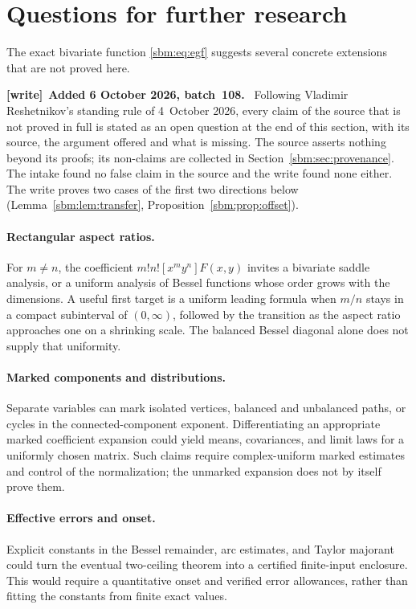 \documentclass[11pt,letterpaper]{article}
\numberwithin{equation}{section}
\theoremstyle{remark}\newtheorem{remark}[theorem]{Remark}
\newenvironment{writenote}[1][]{\par\smallskip\begingroup\small
 \noindent\textbf{[write]}\if\relax\detokenize{#1}\relax\else~\textbf{#1.}\fi\ }%
 {\par\endgroup\smallskip}
\begin{document}
\section{Questions for further research}\label{sbm:sec:future}
The exact bivariate function \eqref{sbm:eq:egf} suggests several concrete
extensions that are not proved here.

\begin{writenote}[Added 6 October 2026, batch~108]
Following Vladimir Reshetnikov's standing rule of 4~October 2026, every claim
of the source that is not proved in full is stated as an open question at the
end of this section, with its source, the argument offered and what is
missing. The source asserts nothing beyond its proofs; its non-claims are
collected in Section~\ref{sbm:sec:provenance}. The intake found no false
claim in the source and the write found none either. The write proves two
cases of the first two directions below (Lemma~\ref{sbm:lem:transfer},
Proposition~\ref{sbm:prop:offset}).
\end{writenote}

\paragraph{Rectangular aspect ratios.}
For $m\neq n$, the coefficient $m!n![x^my^n]F(x,y)$ invites a bivariate saddle analysis, or a uniform analysis of
Bessel functions whose order grows with the dimensions. A useful first target is a uniform leading
formula when $m/n$ stays in a compact subinterval of $(0,\infty)$,
followed by the transition as the aspect ratio approaches one on a
shrinking scale. The balanced Bessel diagonal alone does not supply
that uniformity.

\paragraph{Marked components and distributions.}
Separate variables can mark isolated vertices, balanced and unbalanced
paths, or cycles in the connected-component exponent. Differentiating
an appropriate marked coefficient expansion could yield means,
covariances, and limit laws for a uniformly chosen matrix. Such claims
require complex-uniform marked estimates and control of the
normalization; the unmarked expansion does not by itself prove them.

\paragraph{Effective errors and onset.}
Explicit constants in the Bessel remainder, arc estimates, and Taylor
majorant could turn the eventual two-ceiling theorem into a certified
finite-input enclosure. This would require a quantitative onset and
verified error allowances, rather than fitting the constants from
finite exact values.
\end{document}
